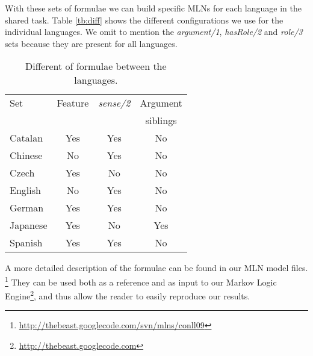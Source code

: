 With these sets of formulae we can build specific MLNs for each language in 
the shared task. Table \ref{tb:diff} shows the different configurations we use for the individual languages. We 
omit to mention the \emph{argument/1}, \emph{hasRole/2} and \emph{role/3} sets because they 
are present for all languages. 


\begin{table}
\begin{center}
\small
\begin{tabular}{|l|c|c|c|}\hline
    Set             & Feature   & \emph{sense/2}  & Argument \\
                &            &        & siblings  \\\hline\hline
Catalan         &   Yes      &  Yes   &  No  \\
Chinese         &   No       &  Yes   &  No  \\
Czech           &   Yes      &  No    &  No  \\
English         &   No       &  Yes   &  No  \\
German          &   Yes      &  Yes   &  No  \\
Japanese        &   Yes      &  No    &  Yes \\
Spanish         &   Yes      &  Yes   &  No  \\
\hline
\end{tabular}
\caption{Different of formulae between the languages.}
\label{tbl:diff}
\normalsize
\end{center}
\end{table}

A more detailed description of the formulae can be found in our MLN model files.  
\footnote{\url{http://thebeast.googlecode.com/svn/mlns/conll09}} They can be 
used both as a reference and as input to our Markov Logic 
Engine\footnote{\url{http://thebeast.googlecode.com}}, and thus allow the reader 
to easily reproduce our results.


